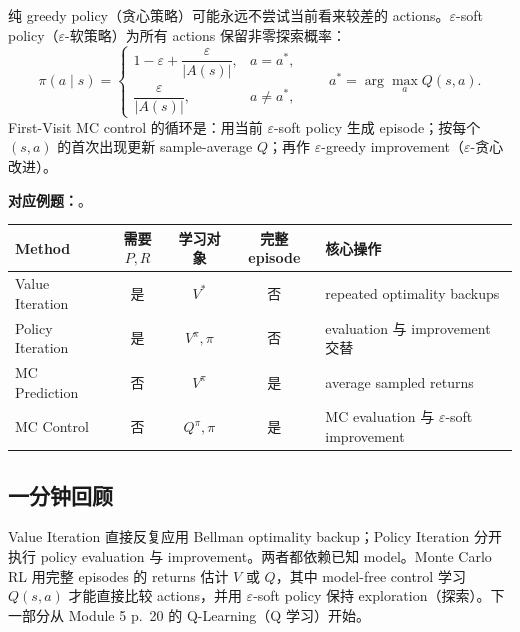 纯 greedy policy（贪心策略）可能永远不尝试当前看来较差的 actions。$\varepsilon$-soft policy（$\varepsilon$-软策略）为所有 actions 保留非零探索概率：
\[
  \pi(a\mid s)=
  \begin{cases}
    1-\varepsilon+\dfrac{\varepsilon}{|A(s)|}, & a=a^*,\\[5pt]
    \dfrac{\varepsilon}{|A(s)|}, & a\ne a^*,
  \end{cases}
  \qquad a^*=\arg\max_a Q(s,a).
\]
First-Visit MC control 的循环是：用当前 $\varepsilon$-soft policy 生成 episode；按每个 $(s,a)$ 的首次出现更新 sample-average $Q$；再作 $\varepsilon$-greedy improvement（$\varepsilon$-贪心改进）。

\textbf{对应例题：}。

\begin{center}
\footnotesize
\begin{tabularx}{\textwidth}{@{}lcccX@{}}
  \toprule
  Method & 需要 $P,R$ & 学习对象 & 完整 episode & 核心操作 \\
  \midrule
  Value Iteration & 是 & $V^*$ & 否 & repeated optimality backups \\
  Policy Iteration & 是 & $V^\pi,\pi$ & 否 & evaluation 与 improvement 交替 \\
  MC Prediction & 否 & $V^\pi$ & 是 & average sampled returns \\
  MC Control & 否 & $Q^\pi,\pi$ & 是 & MC evaluation 与 $\varepsilon$-soft improvement \\
  \bottomrule
\end{tabularx}
\end{center}

\subsection{一分钟回顾}

Value Iteration 直接反复应用 Bellman optimality backup；Policy Iteration 分开执行 policy evaluation 与 improvement。两者都依赖已知 model。Monte Carlo RL 用完整 episodes 的 returns 估计 $V$ 或 $Q$，其中 model-free control 学习 $Q(s,a)$ 才能直接比较 actions，并用 $\varepsilon$-soft policy 保持 exploration（探索）。下一部分从 Module 5 p.~20 的 Q-Learning（Q 学习）开始。
